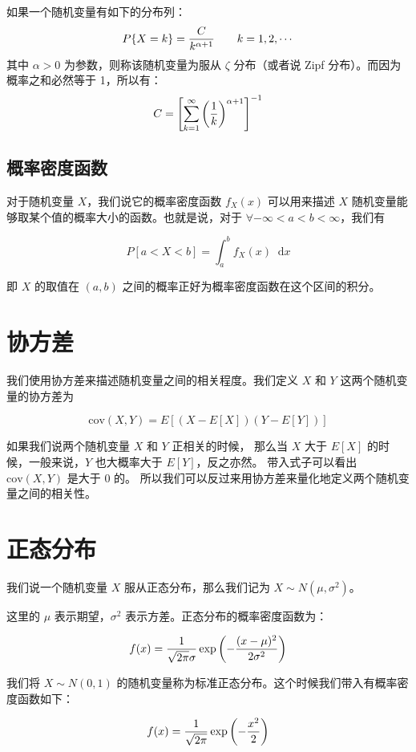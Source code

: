 \documentclass[utf8,a4paper,nofonts,9pt]{ctexbook}
\def\dif{\mathop{}\!\mathrm{d}}
\begin{document}
如果一个随机变量有如下的分布列：
\[
    P\{X = k\} = {C \over k^{\alpha + 1}} \qquad k = 1, 2, \cdots
\]
其中 $\alpha > 0$ 为参数，则称该随机变量为服从 $\zeta$ 分布（或者说 Zipf 分布）。而因为概率之和必然等于 1，所以有：
\[
    C = \left[ \sum_{k = 1}^\infty \left( {1 \over k} \right)^{\alpha + 1} \right]^{-1}
\]


\subsection{概率密度函数}

对于随机变量 $X$，我们说它的概率密度函数 $f_X(x)$ 可以用来描述 $X$ 随机变量能够取某个值的概率大小的函数。也就是说，对于 $\forall -\infty < a < b < \infty$，我们有

$$
P\left[ a < X < b \right] = \int_{a}^{b} f_X(x) \dif{x}
$$

即 $X$ 的取值在 $(a, b)$ 之间的概率正好为概率密度函数在这个区间的积分。



\section{协方差}

我们使用协方差来描述随机变量之间的相关程度。我们定义 $X$ 和 $Y$ 这两个随机变量的协方差为

$$
\textrm{cov}(X, Y) = E\left[ ( X - E[X] ) ( Y - E[Y] ) \right]
$$

如果我们说两个随机变量 $X$ 和 $Y$ 正相关的时候，
那么当 $X$ 大于 $E[X]$ 的时候，一般来说，$Y$ 也大概率大于 $E[Y]$，反之亦然。
带入式子可以看出 $\textrm{cov}(X, Y)$ 是大于 $0$ 的。
所以我们可以反过来用协方差来量化地定义两个随机变量之间的相关性。


\section{正态分布}

我们说一个随机变量 $X$ 服从正态分布，那么我们记为 $X \sim N(\mu, \sigma^2)$。

这里的 $\mu$ 表示期望，$\sigma^2$ 表示方差。正态分布的概率密度函数为：

$$
f(x) = {1 \over \sqrt{2\pi}\sigma} \exp\left(-{(x - \mu)^2 \over 2\sigma^2}\right)
$$

我们将 $X \sim N(0, 1)$ 的随机变量称为标准正态分布。这个时候我们带入有概率密度函数如下：

$$
f(x) = {1 \over \sqrt{2\pi}} \exp\left(-{x^2 \over 2}\right)
$$
\end{document}
